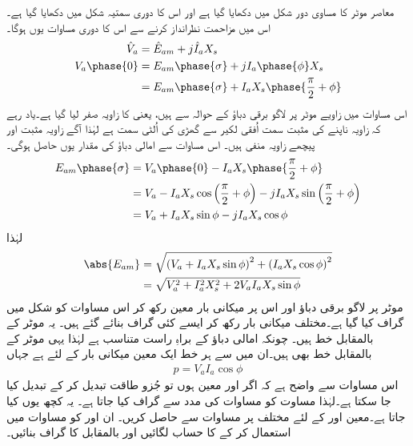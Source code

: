 معاصر موٹر کا مساوی دور شکل  میں دکھایا گیا ہے اور اس کا دوری سمتیہ شکل  میں دکھایا گیا ہے۔ اس میں مزاحمت نظرانداز کرنے سے اس کا دوری مساوات یوں ہوگا۔
\begin{gather}
\begin{aligned}
\hat{V}_a&=\hat{E}_{am}+j \hat{I}_a X_s\\
V_a \phase{0}&=E_{am} \phase{\sigma} +j I_a \phase{\phi} X_s\\
&=E_{am} \phase{\sigma} +I_a X_s \phase{\frac{\pi}{2}+\phi}
\end{aligned}
\end{gather}
اس مساوات میں زاویے موٹر پر لاگو برقی دباؤ  کے حوالہ سے ہیں، یعنی   کا زاویہ صفر لیا گیا ہے۔یاد رہے کہ زاویہ ناپنے کی مثبت سمت اُفقی لکیر سے گھڑی کی اُلٹی سمت ہے لہٰذا آگے زاویہ مثبت اور پیچھے زاویہ منفی ہیں۔ اس مساوات سے امالی دباؤ  کی مقدار یوں حاصل ہوگی۔
\begin{align*}
E_{am}\phase{\sigma}&=V_a \phase{0}-I_a X_s \phase{\frac{\pi}{2}+\phi}\\
&=V_a -I_a X_s  \cos \left( \frac{\pi}{2}+\phi\right)- j I_a X_s \sin \left(\frac{\pi}{2}+\phi \right)\\
&=V_a +I_a X_s \sin \phi-j I_a X_s \cos \phi
\end{align*}
لہٰذا
\begin{gather}
\begin{aligned}
\abs{E_{am}}&=\sqrt{\left(V_a +I_a X_s \sin \phi \right)^2+\left(I_a X_s \cos \phi \right)^2}\\
&=\sqrt{V_a^2+I_a^2 X_s^2+ 2 V_a I_a X_s \sin \phi}
\end{aligned}
\end{gather}
موٹر پر لاگو برقی دباؤ اور اس پر میکانی بار معین رکھ کر اس مساوات کو شکل  میں گراف کیا گیا ہے۔مختلف میکانی بار رکھ کر ایسے کئی گراف بنائے گئے ہیں۔ یہ موٹر کے  بالمقابل   خط ہیں۔ چونکہ امالی دباؤ  کے براہِ راست متناسب ہے لہٰذا یہی موٹر کے  بالمقابل  خط بھی ہیں۔ان میں سے ہر خط ایک معین میکانی بار  کے لئے ہے جہاں
\begin{align}
p=V_a I_a \cos \phi
\end{align}
اس مساوات سے واضح ہے کہ اگر  اور  معین ہوں تو جُزو طاقت تبدیل کر کے  تبدیل کیا جا سکتا ہے۔لہٰذا مساوت  کو مساوات  کی مدد سے گراف کیا جاتا ہے۔ یہ کچھ یوں کیا جاتا ہے۔معین  اور  کے لئے مختلف  پر مساوات   سے  حاصل کریں۔ ان  اور  کو مساوات  میں استعمال کر کے  کا حساب لگائیں اور  بالمقابل  کا گراف بنائیں۔

